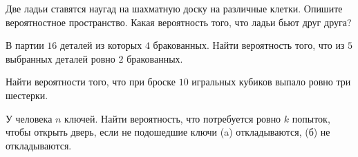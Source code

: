 \begin{problem}
    Две ладьи ставятся наугад на шахматную доску на различные клетки.
    Опишите вероятностное пространство.
    Какая вероятность того, что ладьи бьют друг друга?
\end{problem}

\begin{problem}
    В партии $16$ деталей из которых $4$ бракованных.
    Найти вероятность того, что из $5$ выбранных деталей ровно $2$ бракованных.
\end{problem}

\begin{problem}
    Найти вероятности того, что при броске $10$ игральных кубиков выпало ровно три шестерки.
\end{problem}
\begin{problem}
    У человека $n$ ключей.
    Найти вероятность, что потребуется ровно $k$ попыток, чтобы открыть дверь, если не подошедшие ключи (a) откладываются, (б) не откладываются.
\end{problem}





